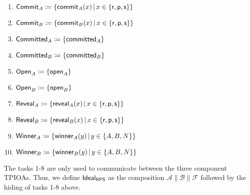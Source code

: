 \documentclass[10pt]{article}
\begin{document}
\begin{example}[$\RPSIdeal$]
\begin{enumerate}
\item $\mathsf{Commit}_A \coloneqq \{\mathsf{commit}_A(x) \, | \, x \in \{\mathsf{r},\mathsf{p},\mathsf{s}\}\}$
\item $\mathsf{Commit}_B \coloneqq \{\mathsf{commit}_B(x) \, | \, x \in \{\mathsf{r},\mathsf{p},\mathsf{s}\}\}$
\item $\mathsf{Committed}_A \coloneqq \{\mathsf{committed}_A\}$
\item $\mathsf{Committed}_B \coloneqq \{\mathsf{committed}_B\}$
\item $\mathsf{Open}_A \coloneqq \{\mathsf{open}_A\}$
\item $\mathsf{Open}_B \coloneqq \{\mathsf{open}_B\}$
\item $\mathsf{Reveal}_A \coloneqq \{\mathsf{reveal}_A(x) \, | \, x \in \{\mathsf{r},\mathsf{p},\mathsf{s}\}\}$
\item $\mathsf{Reveal}_B \coloneqq \{\mathsf{reveal}_B(x) \, | \, x \in \{\mathsf{r},\mathsf{p},\mathsf{s}\}\}$
\item $\mathsf{Winner}_A \coloneqq \{\mathsf{winner}_A(y) \, | \, y \in \{A,B,N\}\}$
\item $\mathsf{Winner}_B \coloneqq \{\mathsf{winner}_B(y) \, | \, y \in \{A,B,N\}\}$
\end{enumerate}
The tasks 1-8 are only used to communicate between the three component TPIOAs. Thus, we define $\RPSIdeal$ as the composition $\mathcal{A} \parallel \mathcal{B} \parallel \mathcal{F}$ followed by the hiding of tasks 1-8 above.
\end{example}
\end{document}
